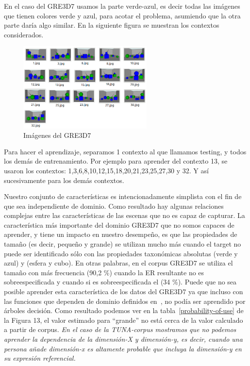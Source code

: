 En el caso del GRE3D7 usamos la parte verde-azul, es decir todas las im\'agenes que tienen colores verde y azul, para acotar el problema, asumiendo que la otra parte dar\'ia algo similar. En la siguiente figura se muestran los contextos considerados.

\begin{figure}[ht]
\centering
\includegraphics[width=0.6\textwidth]{images/imagenesML.png}
\caption{Im\'agenes del GRE3D7}
\label{plurales}
\end{figure}

Para hacer el aprendizaje, separamos 1 contexto al que llamamos testing, y todos los dem\'as de entrenamiento. Por ejemplo para aprender \puse del contexto 13, se usaron los contextos: 1,3,6,8,10,12,15,18,20,21,23,25,27,30 y 32. Y as\'i sucesivamente para los dem\'as contextos.




Nuestro conjunto de caracter\'{i}sticas es intencionadamente simplista con el fin de que sea
independiente de dominio. Como resultado hay algunas relaciones complejas
entre las caracter\'{i}sticas de las escenas que no es capaz de
capturar. La caracter\'{i}stica m\'as importante del dominio GRE3D7
que no somos capaces de aprender, y tiene un impacto en nuestro desempe\~no, es que
las propiedades de tama\~no (es decir, peque\~no y grande) se utilizan mucho
m\'as cuando el target no puede ser identificado s\'olo con las propiedades taxon\'omicas absolutas 
(verde y azul) y (esfera y cubo). En otras palabras, en el corpus GRE3D7 se utiliza el tama\~no con m\'as frecuencia (90,2 \%)
cuando la ER resultante no es sobreespecificada y cuando si es sobreespecificada el (34 \%). 
Puede que no sea posible aprender esta caracter\'{i}stica de los
datos del GRE3D7 ya que incluso con las funciones que dependen de dominio definidos
en~\cite[Cap\'{i}tulo 6] {viet:gene11}, no pod\'{i}a ser aprendido por \'arboles decisi\'on. 
Como resultado podemos ver en la tabla~\ref{probability-of-use} de la Figura 13, el valor estimado para 
``grande'' no est\'a cerca de la
valor calculado a partir de corpus. \textit{En el caso de la TUNA-corpus
  mostramos que no podemos aprender la dependencia de la dimensi\'on-X y
  dimensi\'on-y, es decir, cuando una persona a\~nade dimensi\'on-x es altamente
  probable que incluya la dimensi\'on-y en su expresi\'on referencial.}

